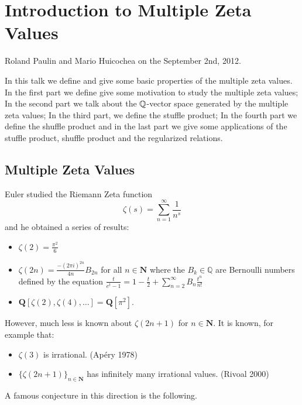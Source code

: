 \chapter{Introduction to Multiple Zeta Values}

Roland Paulin and Mario Huicochea on the September 2nd, 2012.

\medskip
\medskip

\noindent In this talk we define and give some basic properties of the multiple zeta values. In the first part we define give some motivation to  study  the multiple zeta values; In the second part we talk about the $\mathbb{Q}$-vector space generated by the multiple zeta values; In the third part,  we define the stuffle product; In the fourth part we define the shuffle product and in the last part we give some applications of the stuffle product, shuffle product and the regularized relations.

\section{Multiple Zeta Values}

Euler studied the Riemann Zeta function
\[
\zeta(s) = \sum_{n=1}^{\infty} \frac{1}{n^s}
\]
and he obtained a series of results:
\begin{itemize}
\item $\zeta(2) = \frac{\pi^2}{6}$
\item $\zeta(2n) = \frac{-(2\pi i)^{2n}}{4n} B_{2n}$ for all $n \in \mathbf{N}$ where the $B_k \in \mathbb{Q}$ are Bernoulli numbers defined by the equation $\frac{t}{e^t - 1} = 1 - \frac{t}{2} + \sum_{n=2}^{\infty} B_n \frac{t^n}{n!}$
\item $\mathbf{Q}[\zeta(2), \zeta(4), \ldots] = \mathbf{Q}[\pi^2]$.
\end{itemize}

However, much less is known about $\zeta(2n+1)$ for $n \in \mathbf{N}$. It is known, for example that:

\begin{itemize}
\item $\zeta(3)$ is irrational. (Ap\'ery 1978)
\item $\{ \zeta(2n+1) \}_{n \in \mathbf{N}}$ has infinitely many irrational values. (Rivoal 2000)
\end{itemize}

A famous conjecture in this direction is the following.

